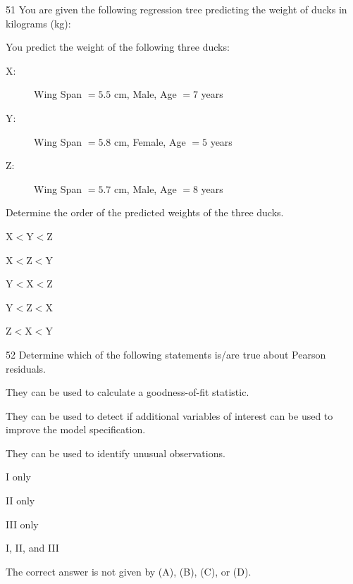 \begin{question}{51}
You are given the following regression tree predicting the weight of ducks in kilograms (kg):


You predict the weight of the following three ducks:
\begin{description}
\item[X:] Wing Span $= 5.5$ cm, Male, Age $= 7$ years
\item[Y:] Wing Span $= 5.8$ cm, Female, Age $= 5$ years
\item[Z:] Wing Span $= 5.7$ cm, Male, Age $= 8$ years
\end{description}

Determine the order of the predicted weights of the three ducks.

\begin{choices}
\item $\mathrm{X} < \mathrm{Y} < \mathrm{Z}$
\item $\mathrm{X} < \mathrm{Z} < \mathrm{Y}$
\item $\mathrm{Y} < \mathrm{X} < \mathrm{Z}$
\item $\mathrm{Y} < \mathrm{Z} < \mathrm{X}$
\item $\mathrm{Z} < \mathrm{X} < \mathrm{Y}$
\end{choices}
\end{question}

\begin{question}{52}
Determine which of the following statements is/are true about Pearson residuals.

\begin{statements}
\item They can be used to calculate a goodness-of-fit statistic.
\item They can be used to detect if additional variables of interest can be used to improve the model specification.
\item They can be used to identify unusual observations.
\end{statements}

\begin{choices}
\item I only
\item II only
\item III only
\item I, II, and III
\item The correct answer is not given by (A), (B), (C), or (D).
\end{choices}
\end{question}

